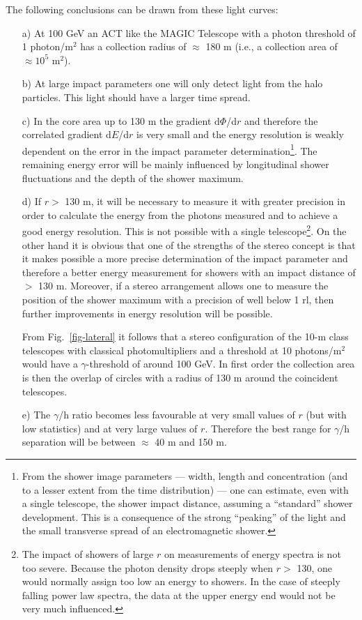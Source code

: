 The following conclusions can be drawn from these \Cerenkov
light curves:
\begin{itemize}
\item[a)]
At 100 GeV an ACT like the MAGIC Telescope with a 
photon threshold of 1 photon/m$^2$ 
has a
collection radius of $\approx$ 180 m (i.e., a collection area
of $\approx 10^5$ m$^2$).
\item[b)]
At large impact parameters one will only detect light
from the halo particles. This light 
should have a larger time spread. 
\item[c)]
In the core area up to 130 m the gradient d$\Phi$/d$r$ and
therefore the correlated gradient 
d$E$/d$r$ is very small and the energy resolution is weakly dependent
on the error in the 
impact parameter determination\footnote{From the shower 
image parameters --- width, length and 
concentration (and to a lesser 
extent from the time distribution) --- one can estimate, even 
with a single telescope, the shower 
impact distance, assuming a ``standard'' shower development. 
This is a consequence of the 
strong ``peaking'' of the \Cerenkov light and the small 
transverse spread of an electromagnetic 
shower.}. 
The remaining energy 
error will be mainly influenced 
by longitudinal shower fluctuations and the depth of the
shower maximum.
\item[d)]
If $r >$ 130 m, it will be necessary to measure it with
greater precision in order to calculate 
the energy from the photons measured and to achieve a good
energy resolution. This is 
not possible with a single telescope\footnote{The impact of 
showers of large $r$ on measurements of
energy spectra is not too severe. 
Because the photon density drops steeply when 
$r >$ 130,
one would normally assign too low an
energy to showers. In the case of steeply falling power law
spectra,  the data at the upper energy end would not be very much
influenced.}. 
On the other hand
it is obvious that one of the 
strengths of the stereo concept is that it makes possible a more 
precise determination of the impact parameter and therefore
a better energy measurement for showers with an
impact distance of $>$ 130 m. 
Moreover, if a stereo arrangement allows one to measure the
position of the shower 
maximum with a precision of well below 1 rl, then further
improvements in energy 
resolution will be possible.

From Fig.~\ref{fig-lateral} it follows that a stereo configuration of the
10-m class telescopes with 
classical photomultipliers and a threshold at 10 photons/m$^2$ 
would have a $\gamma$-threshold of 
around 100 GeV. In first order the collection area is 
then the overlap of circles with a
radius of 130 m around the coincident telescopes.
\item[e)]
The $\gamma$/h ratio becomes less favourable at very small values of
$r$ (but with low statistics) and at 
very large values of $r$. Therefore the best range
for $\gamma$/h separation
will be between $\approx$ 40 m and 150 m.
\end{itemize}

